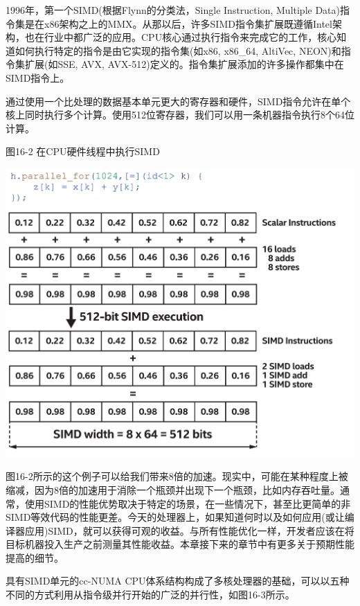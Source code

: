 1996年，第一个SIMD(根据Flynn的分类法，Single Instruction, Multiple Data)指令集是在x86架构之上的MMX。从那以后，许多SIMD指令集扩展既遵循Intel架构，也在行业中都广泛的应用。CPU核心通过执行指令来完成它的工作，核心知道如何执行特定的指令是由它实现的指令集(如x86, x86\_64, AltiVec, NEON)和指令集扩展(如SSE, AVX, AVX-512)定义的。指令集扩展添加的许多操作都集中在SIMD指令上。\par

通过使用一个比处理的数据基本单元更大的寄存器和硬件，SIMD指令允许在单个核上同时执行多个计算。使用512位寄存器，我们可以用一条机器指令执行8个64位计算。\par

\hspace*{\fill} \par %
图16-2 在CPU硬件线程中执行SIMD
\begin{center}
	\includegraphics[width=1.0\textwidth]{content/chapter-16/images/3}
\end{center}

图16-2所示的这个例子可以给我们带来8倍的加速。现实中，可能在某种程度上被缩减，因为8倍的加速用于消除一个瓶颈并出现下一个瓶颈，比如内存吞吐量。通常，使用SIMD的性能优势取决于特定的场景，在一些情况下，甚至比更简单的非SIMD等效代码的性能更差。今天的处理器上，如果知道何时以及如何应用(或让编译器应用)SIMD，就可以获得可观的收益。与所有性能优化一样，开发者应该在将目标机器投入生产之前测量其性能收益。本章接下来的章节中有更多关于预期性能提高的细节。\par

具有SIMD单元的cc-NUMA CPU体系结构构成了多核处理器的基础，可以以五种不同的方式利用从指令级并行开始的广泛的并行性，如图16-3所示。\par


